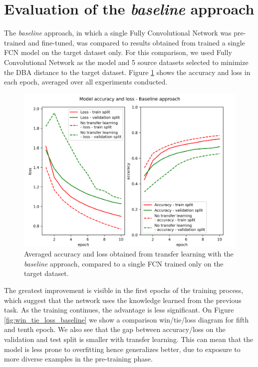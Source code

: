 \documentclass[a4paper,11pt,twoside]{report}
\theoremstyle{definition}
\begin{document}
\section{Evaluation of the \textit{baseline} approach}
The \textit{baseline} approach, in which a single Fully Convolutional Network was pre-trained and fine-tuned, was compared to results obtained from trained a single FCN model on the target dataset only. For this comparison, we used Fully Convolutional Network as the model and 5 source datasets selected to minimize the DBA distance to the target dataset.  Figure \ref{fig:baseline_acc} shows the accuracy and loss in each epoch, averaged over all experiments conducted.


\FloatBarrier

\begin{figure}[h!t]
\centering
\includegraphics[width=17 cm]{imgs/baseline/loss_acc.png}
\caption{Averaged accuracy and loss obtained from transfer learning with the \textit{baseline} approach, compared to a single FCN trained only on the target dataset.}
\label{fig:baseline_acc}
\end{figure}
\FloatBarrier
The greatest improvement is visible in the first epochs of the training process, which suggest that the network uses the knowledge learned from the previous task. As the training continues, the advantage is less significant. On Figure \ref{fig:win_tie_loss_baseline} we show a comparison win/tie/loss diagram for fifth and tenth epoch.
We also see that the gap between accuracy/loss on the validation and test split is smaller with transfer learning. This can mean that the model is less prone to overfitting hence generalizes better, due to exposure to more diverse examples in the pre-training phase.
\end{document}
